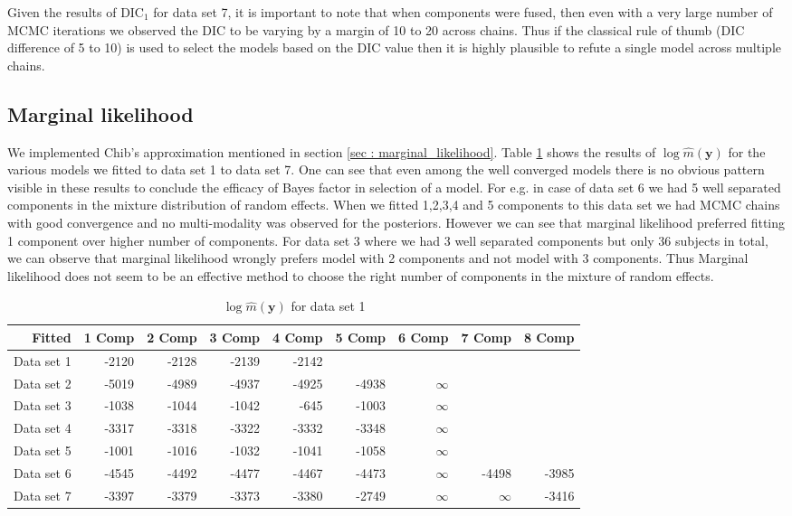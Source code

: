 Given the results of $\text{DIC}_1$ for data set 7, it is important to note that when components were fused, then even with a very large number of MCMC iterations we observed the DIC to be varying by a margin of 10 to 20 across chains. Thus if the classical rule of thumb (DIC difference of 5 to 10) is used to select the models based on the DIC value then it is highly plausible to refute a single model across multiple chains.

\subsection{Marginal likelihood}
\label{subsec : marginal_likelihood_simulation}
We implemented Chib's approximation mentioned in section \ref{sec : marginal_likelihood}. Table \ref{table : marginal_likelihood_results} shows the results of $\log{\hat{m}(\boldsymbol{y})}$ for the various models we fitted to data set 1 to data set 7. One can see that even among the well converged models there is no obvious pattern visible in these results to conclude the efficacy of Bayes factor in selection of a model. For e.g. in case of data set 6 we had 5 well separated components in the mixture distribution of random effects. When we fitted 1,2,3,4 and 5 components to this data set we had MCMC chains with good convergence and no multi-modality was observed for the posteriors. However we can see that marginal likelihood preferred fitting 1 component over higher number of components. For data set 3 where we had 3 well separated components but only 36 subjects in total, we can observe that marginal likelihood wrongly prefers model with 2 components and not model with 3 components. Thus Marginal likelihood does not seem to be an effective method to choose the right number of components in the mixture of random effects.

\begin{table}[!htb]
\centering
\captionsetup{justification=centering}
\caption{$\log{\hat{m}(\boldsymbol{y})}$ for data set 1}
\label{table : marginal_likelihood_results} 
\begin{tabular}{rrrrrrrrr}
\toprule
Fitted & 1 Comp & 2 Comp & 3 Comp & 4 Comp & 5 Comp & 6 Comp & 7 Comp & 8 Comp \\\midrule
Data set 1 & -2120 & -2128 & -2139 & -2142 &  &  &  &  \\
Data set 2 & -5019 & -4989 & -4937 & -4925 & -4938 & $\infty$ &  &  \\
Data set 3 & -1038 & -1044 & -1042 & -645 & -1003 & $\infty$ &  &  \\
Data set 4 & -3317 & -3318 & -3322 & -3332 & -3348 & $\infty$ &  &  \\
Data set 5 & -1001 & -1016 & -1032 & -1041 & -1058 & $\infty$ &  &  \\
Data set 6 & -4545 & -4492 & -4477 & -4467 & -4473 & $\infty$ & -4498 & -3985 \\
Data set 7 & -3397 & -3379 & -3373 & -3380 & -2749 & $\infty$ & $\infty$ & -3416 \\ \bottomrule
\end{tabular}
\end{table}

